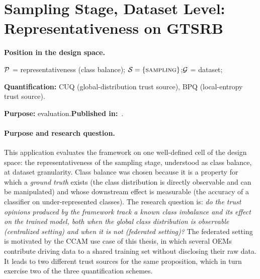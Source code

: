 \FloatBarrier

\section{Sampling Stage, Dataset Level: Representativeness on \acs{GTSRB}}
\label{sec:dataset-trust:applications:gtsrb}

\begin{mdframed}[backgroundcolor=blue!4, linewidth=0pt]
\textbf{Position in the design space.}

$\mathcal{P}$ = representativeness (class balance);\quad
$\mathcal{S} = \{\textsc{sampling}\}$;\quad $\mathcal{G}$ = dataset;\

\textbf{Quantification:} \ac{CUQ} (global-distribution trust source), \ac{BPQ} (local-entropy trust source).\quad

\textbf{Purpose:} evaluation.\quad \textbf{Published in:}~\cite{10.1007/978-3-032-19096-3_17}.
\end{mdframed}

\paragraph{Purpose and research question.}
This application evaluates the framework on one well-defined cell of the design space: the representativeness of the sampling stage, understood as class balance, at dataset granularity. Class balance was chosen because it is a property for which a \emph{ground truth} exists (the class distribution is directly observable and can be manipulated) and whose downstream effect is measurable (the accuracy of a classifier on under-represented classes). The research question is: \emph{do the trust opinions produced by the framework track a known class imbalance and its effect on the trained model, both when the global class distribution is observable (centralized setting) and when it is not (federated setting)?} The federated setting is motivated by the \ac{CCAM} use case of this thesis, in which several \acp{OEM} contribute driving data to a shared training set without disclosing their raw data. It leads to two different trust sources for the same proposition, which in turn exercise two of the three quantification schemes.

